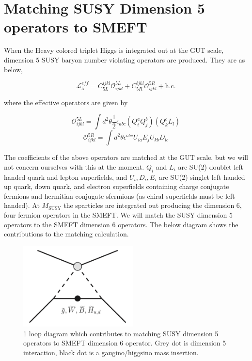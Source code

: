 \documentclass[aps,onecolumn,twoside,secnumarabic,balancelastpage,amsmath,amssymb,nofootinbib,hyperref=pdftex]{revtex4}
\begin{document}
\title{}
\author         {Noah Steinberg}
\date{\today}

\maketitle

\section{Matching SUSY Dimension 5 operators to SMEFT }
When the Heavy colored triplet Higgs is integrated out at the GUT scale, dimension 5 SUSY baryon number violating operators are produced. They are as below,

\begin{equation}
\mathcal{L}^{eff}_{5} = C^{ijkl}_{5L}\mathcal{O}^{5L}_{ijkl} + C^{ijkl}_{5R}\mathcal{O}^{5R}_{ijkl} + \text{h.c.}
\end{equation}

where the effective operators are given by

\begin{equation}
\mathcal{O}^{5L}_{ijkl} = \int d^{2}\theta \frac{1}{2}\epsilon_{abc}(Q^{a}_{i}Q^{b}_{j})(Q^{c}_{k}L_{l})
\end{equation}
\begin{equation}
\mathcal{O}^{5R}_{ijkl} = \int d^{2}\theta \epsilon^{abc}\bar{U}_{ia}\bar{E}_{j}\bar{U}_{kb}\bar{D}_{lc}
\end{equation}

The coefficients of the above operators are matched at the GUT scale, but we will not concern ourselves with this at the moment. $Q_i$ and $L_i$ are SU(2) doublet left handed quark and lepton superfields, and $U_i,D_i,E_i$ are SU(2) singlet left handed up quark, down quark, and electron superfields containing charge conjugate fermions and hermitian conjugate sfermions (as chiral superfields must be left handed). At $M_{\text{SUSY}}$ the sparticles are integrated out producing the dimension 6, four fermion operators in the SMEFT. We will match the SUSY dimension 5 operators to the SMEFT dimension 6 operators. The below diagram shows the contributions to the matching calculation. 

\begin{figure}[htbp]
\begin{center}
\includegraphics[width=6cm]{susy_matching.png}
\caption{1 loop diagram which contributes to matching SUSY dimension 5 operators to SMEFT dimension 6 operator. Grey dot is dimension 5 interaction, black dot is a gaugino/higgsino mass insertion. }
\label{fig:Fig1}
\end{center}
\end{figure}
\end{document}
